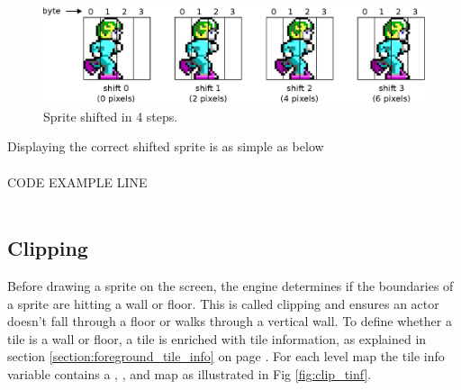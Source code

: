 \documentclass[book.tex]{subfiles}
\begin{document}
\begin{figure}[H]
  \centering
  \includegraphics[width=\textwidth]{imgs/drawings/sprite_shift.eps}
  \caption{Sprite shifted in 4 steps.}
  \label{fig:sprite_shift}  
\end{figure}
\par
Displaying the correct shifted sprite is as simple as below
\\
\\
CODE EXAMPLE LINE
\\
\\ 


\subsection{Clipping}
\label{section:clipping}
Before drawing a sprite on the screen, the engine determines if the boundaries of a sprite are hitting a wall or floor. This is called clipping and ensures an actor doesn't fall through a floor or walks through a vertical wall. To define whether a tile is a wall or floor, a tile is enriched with tile information, as explained in section \ref{section:foreground_tile_info} on page \pageref{section:foreground_tile_info}. For each level map the tile info variable  contains a , ,  and  map as illustrated in Fig \ref{fig:clip_tinf}.\\
\end{document}
